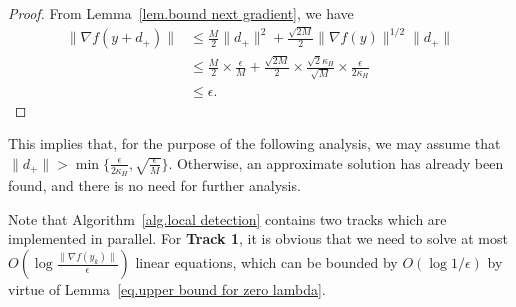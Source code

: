 \documentclass{mcom-l}
\numberwithin{equation}{section}
\begin{document}
\begin{proof}
    From Lemma~\ref{lem.bound next gradient}, we have
    \begin{equation*}
        \begin{aligned}
            \|\nabla f(y+d_+)\| & \leq \frac{M}{2}\|d_+\|^2 + \frac{\sqrt{2M}}{2}\|\nabla f(y)\|^{1/2}\|d_+\|                                                          \\
                                & \leq \frac{M}{2}\times \frac{\epsilon}{M}+\frac{\sqrt{2M}}{2}\times\frac{\sqrt{2}\kappa_H}{\sqrt{M}}\times\frac{\epsilon}{2\kappa_H} \\
                                & \leq \epsilon.
        \end{aligned}
    \end{equation*}
\end{proof}
This implies that, for the purpose of the following analysis, we may assume that $\|d_+\| > \min\{\frac{\epsilon}{2\kappa_H},\sqrt{\frac{\epsilon}{M}}\}$. Otherwise, an approximate solution has already been found, and there is no need for further analysis.

Note that Algorithm~\ref{alg.local detection} contains two tracks which are implemented in parallel. For \textbf{Track 1}, it is obvious that we need to solve at most $O(\log \frac{\|\nabla f(y_k)\|}{\epsilon})$ linear equations, which can be bounded by $O(\log 1/\epsilon)$ by virtue of Lemma~\ref{eq.upper bound for zero lambda}.
\end{document}
